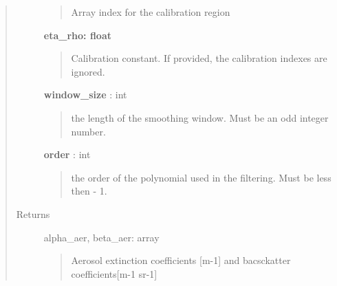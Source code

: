 \documentclass[letterpaper,10pt,english]{sphinxmanual}
\begin{document}
\begin{fulllineitems}
\begin{quote}
\begin{description}
\begin{quote}
Array index for the calibration region
\end{quote}

\textbf{eta\_rho: float}
\begin{quote}

Calibration constant. If provided, the calibration indexes are ignored.
\end{quote}

\textbf{window\_size} : int
\begin{quote}

the length of the smoothing window. Must be an odd integer number.
\end{quote}

\textbf{order} : int
\begin{quote}

the order of the polynomial used in the filtering.
Must be less then  - 1.
\end{quote}

\item[{Returns}] \leavevmode
alpha\_aer, beta\_aer: array
\begin{quote}

Aerosol extinction coefficients {[}m-1{]} and bacsckatter coefficients{[}m-1 sr-1{]}
\end{quote}

\end{description}\end{quote}

\end{fulllineitems}

\end{document}
